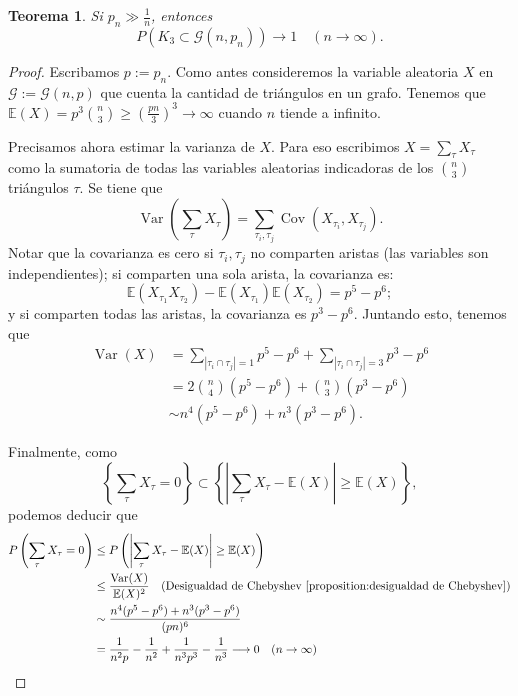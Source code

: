 \documentclass[12pt]{report}
\theoremstyle{plain}
\newtheorem{theorem}{Teorema}[section]
\theoremstyle{definition}
\newcommand{\abs}[1]{\left \vert #1 \right \vert}
\begin{document}
\begin{theorem}
Si $p_n \gg \frac 1 n$, entonces
\[
    P (K_3 \subset \mathcal G (n, p_n)) \longrightarrow 1 \quad (n \to \infty).
\]
\end{theorem}

\begin{proof}

Escribamos $p := p_n$. Como antes consideremos la variable aleatoria $X$ en $\mathcal G := \mathcal G (n,p)$ que cuenta la cantidad de triángulos en un grafo. Tenemos que $\mathbb{E}(X) = p^3 \binom n 3 \geq \left ( \frac{pn}{3} \right )^3 \rightarrow \infty$ cuando $n$ tiende a infinito.

Precisamos ahora estimar la varianza de $X$. Para eso escribimos $X = \sum_{\tau} X_\tau$ como la sumatoria de todas las variables aleatorias indicadoras de los $\binom n 3$ triángulos $\tau$. Se tiene que
\[
    \operatorname{Var} \left ( \sum_{\tau} X_\tau \right ) = \sum_{\tau_i , \tau_j} \operatorname{Cov} (X_{\tau_i}, X_{\tau_j}).
\]
Notar que la covarianza es cero si $\tau_i, \tau_j$ no comparten aristas (las variables son independientes); si comparten una sola arista, la covarianza es:
\[
    \mathbb{E} (X_{\tau_1} X_{\tau_2}) - \mathbb{E} (X_{\tau_1}) \mathbb{E} (X_{\tau_2}) = p^5 - p^6;
\]
y si comparten todas las aristas, la covarianza es $p^3-p^6$. Juntando esto, tenemos que
\begin{align*}
\operatorname{Var} (X) &= \sum_{\abs{\tau_i \cap \tau_j} = 1} p^5 - p^6 + \sum_{\abs{\tau_i \cap \tau_j} = 3} p^3 - p^6 \\
&= 2 \binom n 4 (p^5-p^6) + \binom n 3 (p^3 - p^6) \\
&\sim n^4 (p^5-p^6) + n^3 (p^3 - p^6).
\end{align*}

Finalmente, como
\[
    \left \{ \sum_{\tau} X_\tau = 0\right\} \subset \left \{ \abs {\sum_\tau X_\tau - \mathbb{E} (X)}  \geq \mathbb{E} (X) \right\},
\]
podemos deducir que
\begin{align*}
P\left ( \sum_{\tau} X_\tau = 0 \right ) &\leq P \left ( \abs{\sum_\tau X_\tau - \mathbb{E} (X)} \geq \mathbb{E} (X) \right) \\
&\leq \frac{\operatorname{Var} (X)}{\mathbb{E} (X)^2} \quad (\text{Desigualdad de Chebyshev \ref{proposition:desigualdad de Chebyshev}}) \\
&\sim \frac{n^4 (p^5 - p^6) + n^3 (p^3 - p^6)}{(pn)^6} \\
&= \frac{1}{n^2 p} - \frac{1}{n^2} + \frac{1}{n^3p^3} - \frac{1}{n^3} \longrightarrow 0 \quad (n \to \infty)
\end{align*}
\end{proof}
\end{document}
